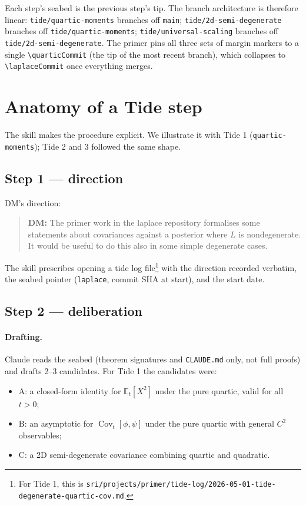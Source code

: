 \documentclass[11pt]{article}
\newcommand{\userbox}[1]{\par\medskip\begin{quote}\small\textbf{\textcolor{blue!60}{DM:}} #1\end{quote}\medskip}
\begin{document}
Each step's seabed is the previous step's tip. The branch architecture
is therefore linear: \texttt{tide/quartic-moments} branches off
\texttt{main}; \texttt{tide/2d-semi-degenerate} branches off
\texttt{tide/quartic-moments}; \texttt{tide/universal-scaling} branches
off \texttt{tide/2d-semi-degenerate}. The primer pins all three sets of
margin markers to a single \texttt{\textbackslash quarticCommit} (the
tip of the most recent branch), which collapses to
\texttt{\textbackslash laplaceCommit} once everything merges.

\section{Anatomy of a Tide step}

The skill makes the procedure explicit. We illustrate it with Tide 1
(\texttt{quartic-moments}); Tide 2 and 3 followed the same shape.

\subsection{Step 1 --- direction}

DM's direction:

\userbox{The primer work in the laplace repository formalises some
statements about covariances against a posterior where $L$ is
nondegenerate. It would be useful to do this also in some simple
degenerate cases.}

The skill prescribes opening a tide log file\footnote{For Tide 1, this
is \texttt{sri/projects/primer/tide-log/2026-05-01-tide-degenerate-quartic-cov.md}.}
with the direction recorded verbatim, the seabed pointer
(\texttt{laplace}, commit SHA at start), and the start date.

\subsection{Step 2 --- deliberation}

\paragraph{Drafting.} Claude reads the seabed (theorem signatures and
\texttt{CLAUDE.md} only, not full proofs) and drafts 2--3 candidates.
For Tide 1 the candidates were:

\begin{itemize}
\item A: a closed-form identity for $\mathbb{E}_t[X^2]$ under the pure
quartic, valid for all $t > 0$;
\item B: an asymptotic for $\operatorname{Cov}_t[\phi,\psi]$ under the
pure quartic with general $C^2$ observables;
\item C: a 2D semi-degenerate covariance combining quartic and
quadratic.
\end{itemize}
\end{document}
